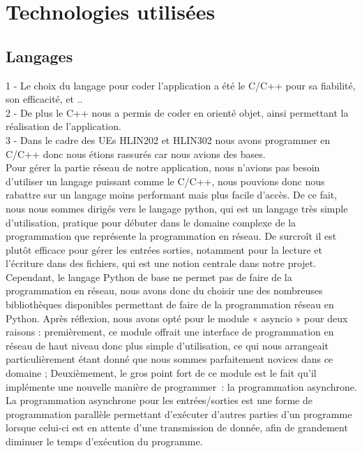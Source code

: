 \documentclass{report}
\begin{document}
\chapter{Technologies utilisées}
\section{Langages}
1 - Le choix du langage pour coder l'application a été le C/C++ pour sa fiabilité, son efficacité, et ..\\ 2 - De plus le C++ nous a permis de coder en orienté objet, ainsi permettant la réalisation de l'application. \\
3 - Dans le cadre des UEs HLIN202 et HLIN302 nous avons programmer en C/C++ donc nous étions rassurés car nous avions des bases. \\

Pour gérer la partie réseau de notre application, nous n'avions pas besoin d'utiliser un langage puissant comme le C/C++, nous pouvions donc nous rabattre sur un langage moins performant mais plus facile d'accès.
De ce fait, nous nous sommes dirigés vers le langage python, qui est un langage très simple d'utilisation, pratique pour débuter dans le domaine complexe de la programmation que représente la programmation en réseau. De surcroît il est plutôt efficace pour gérer les entrées sorties, notamment pour la lecture et l'écriture dans des fichiers, qui est une notion centrale dans notre projet.\\

Cependant, le langage Python de base ne permet pas de faire de la programmation en réseau, nous avons donc du choisir une des nombreuses bibliothèques disponibles permettant de faire de la programmation réseau en Python. Après réflexion, nous avons opté pour le module « asyncio » pour deux raisons : premièrement, ce module offrait une interface de programmation en réseau de haut niveau donc plus simple d'utilisation, ce qui nous arrangeait particulièrement étant donné que nous sommes parfaitement novices dans ce domaine ; Deuxièmement, le gros point fort de ce module est le fait qu'il implémente une nouvelle manière de programmer~: la programmation asynchrone. La programmation asynchrone pour les entrées/sorties est une forme de programmation parallèle permettant d'exécuter d'autres parties d'un programme lorsque celui-ci est en attente d'une transmission de donnée, afin de grandement diminuer le temps d'exécution du programme.
\end{document}
